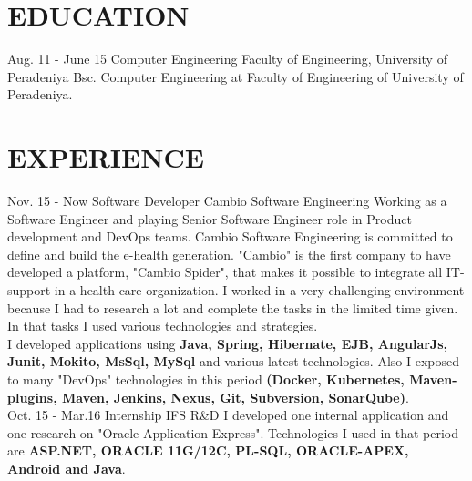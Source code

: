 \documentclass[]{cv-class}
\begin{document}
\section{EDUCATION}
\begin{entrylist}
  \entry
    {Aug. 11 - June 15}
    {Computer Engineering}
    {Faculty of Engineering, University of Peradeniya}
    {Bsc. Computer Engineering at Faculty of Engineering of University of Peradeniya.}
\end{entrylist}

\section{EXPERIENCE}
\begin{entrylist}
  \entry
    {Nov. 15 - Now}
    {Software Developer}
    {Cambio Software Engineering}
    {Working as a Software Engineer and playing Senior Software Engineer role in Product development and DevOps teams. Cambio Software Engineering is committed to define and build the e-health generation. "Cambio" is the first company to have developed a platform, "Cambio Spider", that makes it possible to integrate all IT-support in a health-care organization. I worked in a very challenging environment because I had to research a lot and complete the tasks in the limited time given. In that tasks I used various technologies and strategies. \\I developed applications using \textbf{Java, Spring, Hibernate, EJB, AngularJs, Junit, Mokito, MsSql, MySql} and various latest technologies. Also I exposed to many "DevOps" technologies in this period \textbf{(Docker, Kubernetes, Maven-plugins, Maven, Jenkins, Nexus, Git, Subversion, SonarQube)}.}
\\
  \entry
    {Oct. 15 - Mar.16}
    {Internship}
    {IFS R\&D}
    {I developed one internal application and one research on "Oracle Application Express". Technologies I used in that period are \textbf{ASP.NET, ORACLE 11G/12C, PL-SQL, ORACLE-APEX, Android and Java}.}
\end{entrylist}
\end{document}
